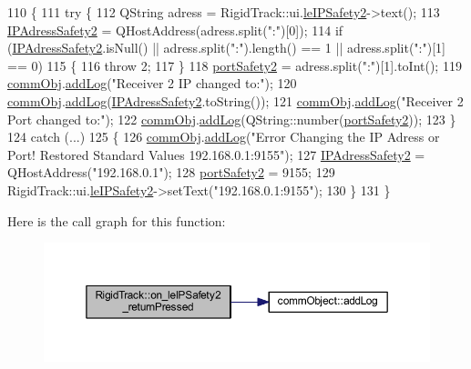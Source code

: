\begin{DoxyCode}
110 \{
111     \textcolor{keywordflow}{try} \{
112     QString adress = RigidTrack::ui.\hyperlink{class_ui___rigid_track_class_a70522f29594cbdc654ffed858b3e1fc5}{leIPSafety2}->text();
113     \hyperlink{main_8cpp_a354806cf8cbface3575f2541d8fbcbda}{IPAdressSafety2} = QHostAddress(adress.split(\textcolor{stringliteral}{":"})[0]);
114     \textcolor{keywordflow}{if} (\hyperlink{main_8cpp_a354806cf8cbface3575f2541d8fbcbda}{IPAdressSafety2}.isNull() || adress.split(\textcolor{stringliteral}{":"}).length() == 1 || adress.split(\textcolor{stringliteral}{":"})[1] 
      == 0)
115     \{
116         \textcolor{keywordflow}{throw} 2;
117     \}
118     \hyperlink{main_8cpp_a2601be9c226be24c71ec8282f632e723}{portSafety2} = adress.split(\textcolor{stringliteral}{":"})[1].toInt();
119     \hyperlink{main_8cpp_af29e7fc07ae0979d5fb61b473241d33d}{commObj}.\hyperlink{classcomm_object_aec354c7099b3039083cc4224e071e022}{addLog}(\textcolor{stringliteral}{"Receiver 2 IP changed to:"});
120     \hyperlink{main_8cpp_af29e7fc07ae0979d5fb61b473241d33d}{commObj}.\hyperlink{classcomm_object_aec354c7099b3039083cc4224e071e022}{addLog}(\hyperlink{main_8cpp_a354806cf8cbface3575f2541d8fbcbda}{IPAdressSafety2}.toString());
121     \hyperlink{main_8cpp_af29e7fc07ae0979d5fb61b473241d33d}{commObj}.\hyperlink{classcomm_object_aec354c7099b3039083cc4224e071e022}{addLog}(\textcolor{stringliteral}{"Receiver 2 Port changed to:"});
122     \hyperlink{main_8cpp_af29e7fc07ae0979d5fb61b473241d33d}{commObj}.\hyperlink{classcomm_object_aec354c7099b3039083cc4224e071e022}{addLog}(QString::number(\hyperlink{main_8cpp_a2601be9c226be24c71ec8282f632e723}{portSafety2}));
123     \}
124     \textcolor{keywordflow}{catch} (...)
125     \{
126         \hyperlink{main_8cpp_af29e7fc07ae0979d5fb61b473241d33d}{commObj}.\hyperlink{classcomm_object_aec354c7099b3039083cc4224e071e022}{addLog}(\textcolor{stringliteral}{"Error Changing the IP Adress or Port! Restored Standard Values
       192.168.0.1:9155"});
127         \hyperlink{main_8cpp_a354806cf8cbface3575f2541d8fbcbda}{IPAdressSafety2} = QHostAddress(\textcolor{stringliteral}{"192.168.0.1"});
128         \hyperlink{main_8cpp_a2601be9c226be24c71ec8282f632e723}{portSafety2} = 9155;
129         RigidTrack::ui.\hyperlink{class_ui___rigid_track_class_a70522f29594cbdc654ffed858b3e1fc5}{leIPSafety2}->setText(\textcolor{stringliteral}{"192.168.0.1:9155"});
130     \}
131 \}
\end{DoxyCode}
Here is the call graph for this function\+:\nopagebreak
\begin{figure}[H]
\begin{center}
\leavevmode
\includegraphics[width=350pt]{class_rigid_track_a555c536593d659b940de43cd2db8d6c1_cgraph}
\end{center}
\end{figure}
